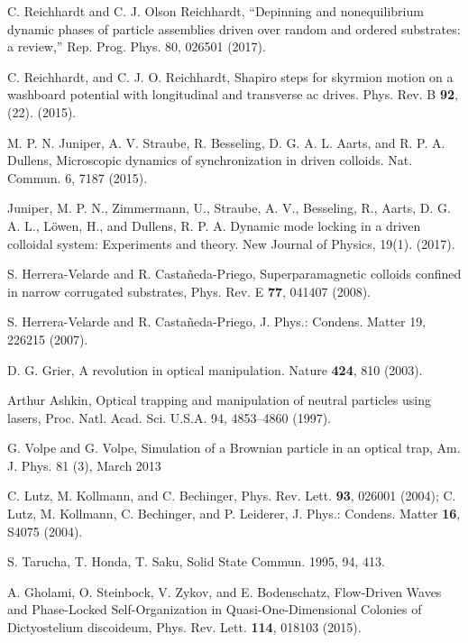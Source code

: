 \documentclass[twocolumn,preprintnumbers,amsmath,amssymb,aps,prx]{revtex4}
\begin{document}
\begin{thebibliography}{99}
     C. Reichhardt and C. J. Olson Reichhardt, “Depinning and nonequilibrium dynamic phases of particle assemblies driven over random and ordered substrates: a review,” Rep. Prog. Phys. 80, 026501 (2017).

     C. Reichhardt, and C. J. O. Reichhardt,  Shapiro steps for skyrmion motion on a washboard potential with longitudinal and transverse ac drives. Phys. Rev. B {\bf 92}, (22). (2015).
      
     M. P. N. Juniper, A. V. Straube, R. Besseling, D. G. A. L. Aarts, and R. P. A. Dullens, Microscopic dynamics of synchronization in driven colloids. Nat. Commun. 6, 7187 (2015).

     Juniper, M. P. N., Zimmermann, U., Straube, A. V., Besseling, R., Aarts, D. G. A. L., Löwen, H., and Dullens, R. P. A.  Dynamic mode locking in a driven colloidal system: Experiments and theory. New Journal of Physics, 19(1). (2017).  %
      
     S. Herrera-Velarde and R. Castañeda-Priego, Superparamagnetic colloids confined in narrow corrugated substrates, Phys. Rev. E {\bf 77}, 041407 (2008).

     S. Herrera-Velarde and R. Castañeda-Priego, J. Phys.: Condens. Matter 19, 226215 (2007).

     D. G. Grier, A revolution in optical manipulation. Nature {\bf 424}, 810 (2003).

      Arthur Ashkin, Optical trapping and manipulation of neutral particles using lasers, Proc. Natl. Acad. Sci. U.S.A. 94, 4853–4860 (1997).
        
       G. Volpe and G. Volpe, Simulation of a Brownian particle in an optical trap, Am. J. Phys. 81 (3), March 2013
        
     C. Lutz, M. Kollmann, and C. Bechinger, Phys. Rev. Lett. {\bf 93}, 026001 (2004); C. Lutz, M. Kollmann, C. Bechinger, and P. Leiderer, J. Phys.: Condens. Matter {\bf 16}, S4075 (2004).

      S. Tarucha, T. Honda,  T. Saku, Solid State Commun. 1995, 94, 413.

     A. Gholami, O. Steinbock, V. Zykov, and E. Bodenschatz, Flow-Driven Waves and Phase-Locked Self-Organization in Quasi-One-Dimensional Colonies of Dictyostelium discoideum, Phys. Rev. Lett. {\bf 114}, 018103 (2015).


\end{thebibliography}
\end{document}

